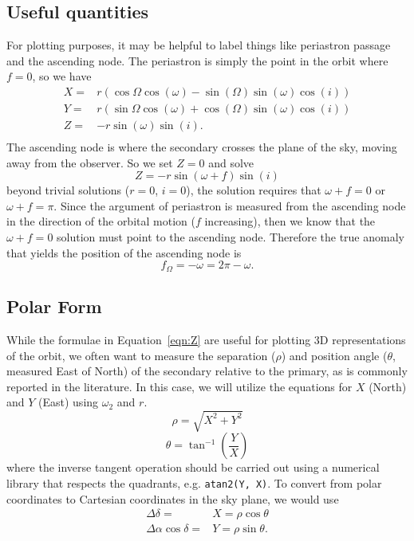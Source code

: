 \documentclass[modern]{aastex61}
\begin{document}
\subsection{Useful quantities}
For plotting purposes, it may be helpful to label things like periastron passage and the ascending node. The periastron is simply the point in the orbit where $f = 0$, so we have
\begin{equation}
  \begin{array}{lc}
    X =& r (\cos \Omega \cos(\omega) - \sin(\Omega) \sin(\omega) \cos(i)) \\
    Y =& r (\sin \Omega \cos(\omega) + \cos(\Omega) \sin(\omega) \cos(i)) \\
    Z =& - r \sin(\omega) \sin(i).\\
\end{array}
\end{equation}
The ascending node is where the secondary crosses the plane of the sky, moving away from the observer. So we set $Z = 0$ and solve
\begin{equation}
  Z = - r \sin(\omega + f ) \sin(i)
\end{equation}
beyond trivial solutions ($r = 0$, $i = 0$), the solution requires that $\omega + f = 0$ or $\omega + f = \pi$. Since the argument of periastron is measured from the ascending node in the direction of the orbital motion ($f$ increasing), then we know that the $\omega + f = 0$ solution must point to the ascending node. Therefore the true anomaly that yields the position of the ascending node is
\begin{equation}
  f_\Omega = -\omega = 2 \pi - \omega.
\end{equation}

\subsection{Polar Form}
While the formulae in Equation~\ref{eqn:Z} are useful for plotting 3D representations of the orbit, we often want to measure the separation ($\rho$) and position angle ($\theta$, measured East of North) of the secondary relative to the primary, as is commonly reported in the literature. In this case, we will utilize the equations for $X$ (North) and $Y$ (East) using $\omega_2$ and $r$.
\begin{equation}
  \rho = \sqrt{X^2 + Y^2}
\end{equation}
\begin{equation}
  \theta = \tan^{-1}\left (\frac{Y}{X} \right )
\end{equation}
where the inverse tangent operation should be carried out using a numerical library that respects the quadrants, e.g. \texttt{atan2(Y, X)}. To convert from polar coordinates to Cartesian coordinates in the sky plane, we would use
\begin{eqnarray}
  \Delta \delta =& X = \rho \cos \theta \\
  \Delta \alpha \cos \delta =& Y = \rho \sin \theta.
\end{eqnarray}
\end{document}

